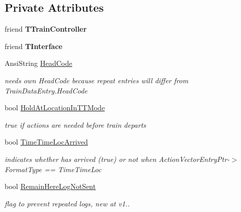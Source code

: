 \subsection*{Private Attributes}
\begin{DoxyCompactItemize}
\item 
\mbox{\label{class_t_train_abb385030108fe96cdcd550b2aa2072a7}} 
friend {\bfseries T\+Train\+Controller}
\item 
\mbox{\label{class_t_train_a0dd5144abd7dbc49a714d6c2e4cc1851}} 
friend {\bfseries T\+Interface}
\item 
\mbox{\label{class_t_train_a68f4b62f3405f80d58f33519392ab37e}} 
Ansi\+String \mbox{\hyperlink{class_t_train_a68f4b62f3405f80d58f33519392ab37e}{Head\+Code}}
\begin{DoxyCompactList}\small\item\em needs own Head\+Code because repeat entries will differ from Train\+Data\+Entry.\+Head\+Code \end{DoxyCompactList}\item 
\mbox{\label{class_t_train_a8f90e7446fd72ae99641a7ca9ee76ab6}} 
bool \mbox{\hyperlink{class_t_train_a8f90e7446fd72ae99641a7ca9ee76ab6}{Hold\+At\+Location\+In\+T\+T\+Mode}}
\begin{DoxyCompactList}\small\item\em true if actions are needed before train departs \end{DoxyCompactList}\item 
\mbox{\label{class_t_train_a4bfd087e177535b7e3086393c09e40a6}} 
bool \mbox{\hyperlink{class_t_train_a4bfd087e177535b7e3086393c09e40a6}{Time\+Time\+Loc\+Arrived}}
\begin{DoxyCompactList}\small\item\em indicates whether has arrived (true) or not when Action\+Vector\+Entry\+Ptr-\/$>$Format\+Type == Time\+Time\+Loc \end{DoxyCompactList}\item 
\mbox{\label{class_t_train_a52721f222fff0b6e08fffe94d693ac65}} 
bool \mbox{\hyperlink{class_t_train_a52721f222fff0b6e08fffe94d693ac65}{Remain\+Here\+Log\+Not\+Sent}}
\begin{DoxyCompactList}\small\item\em flag to prevent repeated logs, new at v1.. \end{DoxyCompactList}\item 

\end{DoxyCompactItemize}
